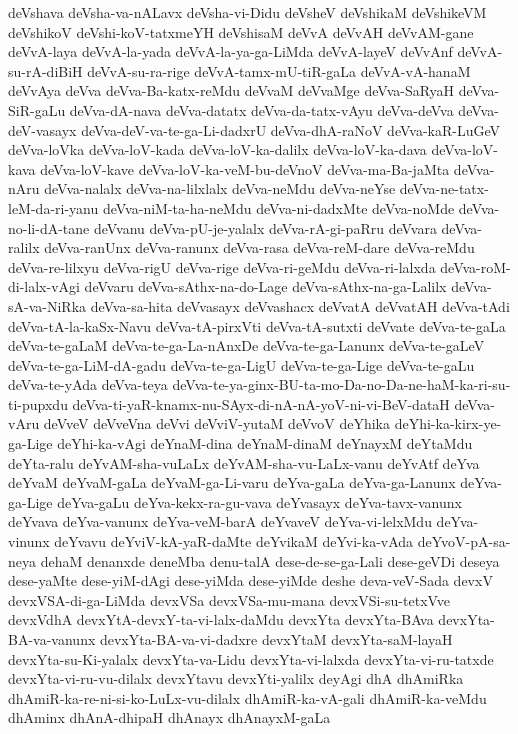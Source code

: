 {deVshava
deVsha-va-nALavx
deVsha-vi-Didu
deVsheV
deVshikaM
deVshikeVM
deVshikoV
deVshi-koV-tatxmeYH
deVshisaM
deVvA
deVvAH
deVvAM-gane
deVvA-laya
deVvA-la-yada
deVvA-la-ya-ga-LiMda
deVvA-layeV
deVvAnf
deVvA-su-rA-diBiH
deVvA-su-ra-rige
deVvA-tamx-mU-tiR-gaLa
deVvA-vA-hanaM
deVvAya
deVva
deVva-Ba-katx-reMdu
deVvaM
deVvaMge
deVva-SaRyaH
deVva-SiR-gaLu
deVva-dA-nava
deVva-datatx
deVva-da-tatx-vAyu
deVva-deVva
deVva-deV-vasayx
deVva-deV-va-te-ga-Li-dadxrU
deVva-dhA-raNoV
deVva-kaR-LuGeV
deVva-loVka
deVva-loV-kada
deVva-loV-ka-dalilx
deVva-loV-ka-dava
deVva-loV-kava
deVva-loV-kave
deVva-loV-ka-veM-bu-deVnoV
deVva-ma-Ba-jaMta
deVva-nAru
deVva-nalalx
deVva-na-lilxlalx
deVva-neMdu
deVva-neYse
deVva-ne-tatx-leM-da-ri-yanu
deVva-niM-ta-ha-neMdu
deVva-ni-dadxMte
deVva-noMde
deVva-no-li-dA-tane
deVvanu
deVva-pU-je-yalalx
deVva-rA-gi-paRru
deVvara
deVva-ralilx
deVva-ranUnx
deVva-ranunx
deVva-rasa
deVva-reM-dare
deVva-reMdu
deVva-re-lilxyu
deVva-rigU
deVva-rige
deVva-ri-geMdu
deVva-ri-lalxda
deVva-roM-di-lalx-vAgi
deVvaru
deVva-sAthx-na-do-Lage
deVva-sAthx-na-ga-Lalilx
deVva-sA-va-NiRka
deVva-sa-hita
deVvasayx
deVvashacx
deVvatA
deVvatAH
deVva-tAdi
deVva-tA-la-kaSx-Navu
deVva-tA-pirxVti
deVva-tA-sutxti
deVvate
deVva-te-gaLa
deVva-te-gaLaM
deVva-te-ga-La-nAnxDe
deVva-te-ga-Lanunx
deVva-te-gaLeV
deVva-te-ga-LiM-dA-gadu
deVva-te-ga-LigU
deVva-te-ga-Lige
deVva-te-gaLu
deVva-te-yAda
deVva-teya
deVva-te-ya-ginx-BU-ta-mo-Da-no-Da-ne-haM-ka-ri-su-ti-pupxdu
deVva-ti-yaR-knamx-nu-SAyx-di-nA-nA-yoV-ni-vi-BeV-dataH
deVva-vAru
deVveV
deVveVna
deVvi
deVviV-yutaM
deVvoV
deYhika
deYhi-ka-kirx-ye-ga-Lige
deYhi-ka-vAgi
deYnaM-dina
deYnaM-dinaM
deYnayxM
deYtaMdu
deYta-ralu
deYvAM-sha-vuLaLx
deYvAM-sha-vu-LaLx-vanu
deYvAtf
deYva
deYvaM
deYvaM-gaLa
deYvaM-ga-Li-varu
deYva-gaLa
deYva-ga-Lanunx
deYva-ga-Lige
deYva-gaLu
deYva-kekx-ra-gu-vava
deYvasayx
deYva-tavx-vanunx
deYvava
deYva-vanunx
deYva-veM-barA
deYvaveV
deYva-vi-lelxMdu
deYva-vinunx
deYvavu
deYviV-kA-yaR-daMte
deYvikaM
deYvi-ka-vAda
deYvoV-pA-sa-neya
dehaM
denanxde
deneMba
denu-talA
dese-de-se-ga-Lali
dese-geVDi
deseya
dese-yaMte
dese-yiM-dAgi
dese-yiMda
dese-yiMde
deshe
deva-veV-Sada
devxV
devxVSA-di-ga-LiMda
devxVSa
devxVSa-mu-mana
devxVSi-su-tetxVve
devxVdhA
devxYtA-devxY-ta-vi-lalx-daMdu
devxYta
devxYta-BAva
devxYta-BA-va-vanunx
devxYta-BA-va-vi-dadxre
devxYtaM
devxYta-saM-layaH
devxYta-su-Ki-yalalx
devxYta-va-Lidu
devxYta-vi-lalxda
devxYta-vi-ru-tatxde
devxYta-vi-ru-vu-dilalx
devxYtavu
devxYti-yalilx
deyAgi
dhA
dhAmiRka
dhAmiR-ka-re-ni-si-ko-LuLx-vu-dilalx
dhAmiR-ka-vA-gali
dhAmiR-ka-veMdu
dhAminx
dhAnA-dhipaH
dhAnayx
dhAnayxM-gaLa
}
